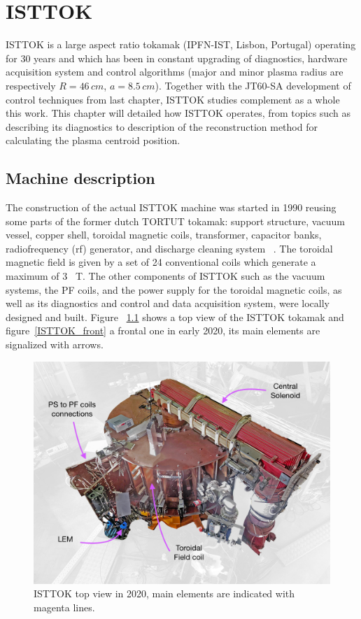 \chapter{ISTTOK }

ISTTOK is a large aspect ratio tokamak (IPFN-IST, Lisbon, Portugal) operating for 30 years and which has been in constant upgrading of diagnostics, hardware acquisition system and control algorithms (major and minor plasma radius are respectively $R= 46 \, cm$, $a= 8.5 \, cm$). Together with the JT60-SA development of control techniques from last chapter, ISTTOK  studies  complement as a whole this work. This chapter will detailed how ISTTOK operates, from topics such as describing its diagnostics to description of the reconstruction method for calculating the plasma centroid position.

\section{Machine description}

The construction  of the actual ISTTOK machine was started in 1990 reusing some parts of the former dutch TORTUT tokamak: support structure, vacuum vessel, copper shell, toroidal magnetic coils, transformer, capacitor banks, radiofrequency (rf) generator, and discharge cleaning system ~\cite{Varandas1996}. The toroidal magnetic field is given by a set of 24 conventional coils which generate a maximum of 3~ T. The other components of ISTTOK such as the vacuum systems, the PF coils, and the power supply for the toroidal magnetic coils,  as well as its diagnostics and control and data acquisition system, were locally designed and built. Figure ~\ref{TopISTTOK} shows a top view of the ISTTOK tokamak and figure~\ref{ISTTOK_front} a frontal one in early 2020, its main elements are signalized with arrows.\smallskip

\begin{figure}[htbp]
	\centering
	\includegraphics[width=1.1\textwidth]{Chp4/TopISTTOK.png}
	\caption{\label{TopISTTOK} ISTTOK top view in 2020,   main elements are indicated with magenta  lines.}
\end{figure}

